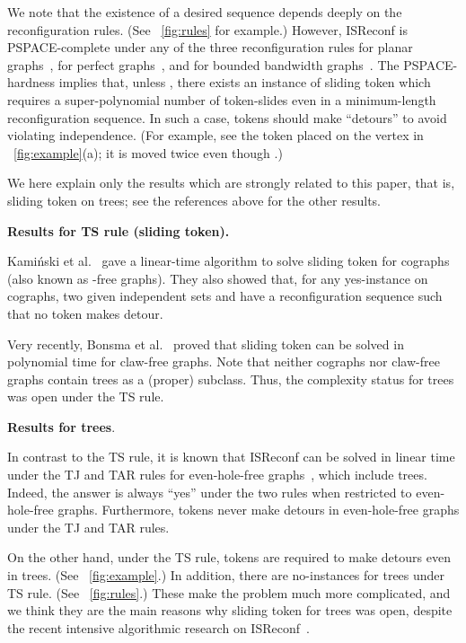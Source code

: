 \documentclass{llncs}
\newcounter{two}
\newcounter{three}
\begin{document}
\noindent
 	We note that the existence of a desired sequence depends deeply on the reconfiguration rules. 
 (See \figurename~\ref{fig:rules} for example.) 
	However, {\sc ISReconf} is PSPACE-complete under any of the three reconfiguration rules for planar graphs~\cite{BC09,HearnDemaine2005,HearnDemaine2009}, for perfect graphs~\cite{KaminskiMedvedevMilanic2012}, and for bounded bandwidth graphs~\cite{Wro14}.
	The PSPACE-hardness implies that, unless , there exists an instance of {\sc sliding token} which requires a super-polynomial number of token-slides even in a minimum-length reconfiguration sequence. 
In such a case, tokens should make ``detours'' to avoid violating independence.
(For example, see the token placed on the vertex  in \figurename~\ref{fig:example}(a);
it is moved twice even though .)


	We here explain only the results which are strongly related to this paper, that is, {\sc sliding token} on trees;
see the references above for the other results.  
\medskip

\noindent
{\bf Results for TS rule ({\sc sliding token}).}

	Kami\'nski et al.~\cite{KaminskiMedvedevMilanic2012} gave a linear-time algorithm to solve {\sc sliding token} for cographs 
(also known as -free graphs). 
	They also showed that, for any yes-instance on cographs, two given independent sets  and  have a reconfiguration sequence such that no token makes detour. 

	Very recently, Bonsma et al.~\cite{BKW14} proved that {\sc sliding token} can be solved in polynomial time for claw-free graphs. 
	Note that neither cographs nor claw-free graphs contain trees as a (proper) subclass. 
	Thus, the complexity status for trees was open under the TS rule. 
\medskip


\noindent
{\bf Results for trees}.

	In contrast to the TS rule, it is known that {\sc ISReconf} can be solved in linear time under the TJ and TAR rules for even-hole-free graphs~\cite{KaminskiMedvedevMilanic2012}, which include trees. 
	Indeed, the answer is always ``yes'' under the two rules when restricted to even-hole-free graphs.
Furthermore, tokens never make detours in even-hole-free graphs under the TJ and TAR rules.

	On the other hand, under the TS rule, tokens are required to make detours even in trees.
(See \figurename~\ref{fig:example}.)
	In addition, there are no-instances for trees under TS rule.
(See \figurename~\ref{fig:rules}.)
	These make the problem much more complicated, and we think they are the main reasons why {\sc sliding token} for trees was open, despite the recent intensive algorithmic research on {\sc ISReconf}~\cite{BB14,Bon14,BKW14,ItoKaminskiOnoSuzukiUeharaYamanaka2014,KaminskiMedvedevMilanic2012,MNRW14}. 
\end{document}
